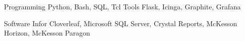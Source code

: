

\begin{cvskills}

  \cvskill
    {Programming} %
    {Python, Bash, SQL, Tcl} %
\cvskill
    {Tools} %
    {Flask, Icinga, Graphite, Grafana} %

  \cvskill
    {Software} %
    {Infor Cloverleaf, Microsoft SQL Server, Crystal Reports, McKesson Horizon, McKesson Paragon} %

\end{cvskills}
